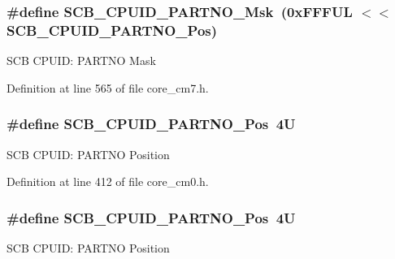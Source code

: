 \subsubsection[{\texorpdfstring{S\+C\+B\+\_\+\+C\+P\+U\+I\+D\+\_\+\+P\+A\+R\+T\+N\+O\+\_\+\+Msk}{SCB_CPUID_PARTNO_Msk}}]{\setlength{\rightskip}{0pt plus 5cm}\#define S\+C\+B\+\_\+\+C\+P\+U\+I\+D\+\_\+\+P\+A\+R\+T\+N\+O\+\_\+\+Msk~(0x\+F\+F\+F\+U\+L $<$$<$ S\+C\+B\+\_\+\+C\+P\+U\+I\+D\+\_\+\+P\+A\+R\+T\+N\+O\+\_\+\+Pos)}\hypertarget{group___c_m_s_i_s___s_c_b_ga98e581423ca016680c238c469aba546d}{}\label{group___c_m_s_i_s___s_c_b_ga98e581423ca016680c238c469aba546d}
S\+CB C\+P\+U\+ID\+: P\+A\+R\+T\+NO Mask 

Definition at line 565 of file core\+\_\+cm7.\+h.

\subsubsection[{\texorpdfstring{S\+C\+B\+\_\+\+C\+P\+U\+I\+D\+\_\+\+P\+A\+R\+T\+N\+O\+\_\+\+Pos}{SCB_CPUID_PARTNO_Pos}}]{\setlength{\rightskip}{0pt plus 5cm}\#define S\+C\+B\+\_\+\+C\+P\+U\+I\+D\+\_\+\+P\+A\+R\+T\+N\+O\+\_\+\+Pos~4U}\hypertarget{group___c_m_s_i_s___s_c_b_ga705f68eaa9afb042ca2407dc4e4629ac}{}\label{group___c_m_s_i_s___s_c_b_ga705f68eaa9afb042ca2407dc4e4629ac}
S\+CB C\+P\+U\+ID\+: P\+A\+R\+T\+NO Position 

Definition at line 412 of file core\+\_\+cm0.\+h.

\subsubsection[{\texorpdfstring{S\+C\+B\+\_\+\+C\+P\+U\+I\+D\+\_\+\+P\+A\+R\+T\+N\+O\+\_\+\+Pos}{SCB_CPUID_PARTNO_Pos}}]{\setlength{\rightskip}{0pt plus 5cm}\#define S\+C\+B\+\_\+\+C\+P\+U\+I\+D\+\_\+\+P\+A\+R\+T\+N\+O\+\_\+\+Pos~4U}\hypertarget{group___c_m_s_i_s___s_c_b_ga705f68eaa9afb042ca2407dc4e4629ac}{}\label{group___c_m_s_i_s___s_c_b_ga705f68eaa9afb042ca2407dc4e4629ac}
S\+CB C\+P\+U\+ID\+: P\+A\+R\+T\+NO Position 

